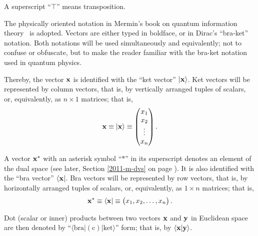 A superscript ``$\intercal$'' means transposition.

The physically oriented notation in Mermin's book on
quantum information theory~\cite{mermin-04} is adopted.
Vectors are either typed in boldface, or in Dirac's ``bra-ket'' notation\cite{dirac}.
Both notations will be used simultaneously and equivalently;
not to confuse or obfuscate, but to make  the reader familiar with the bra-ket
notation used in quantum physics.

Thereby,
the vector ${\bf x}$ is identified with the ``ket vector'' $\vert {\bf x}\rangle$.
Ket vectors will be represented by column vectors, that is, by vertically arranged tuples of scalars,
or, equivalently, as $n \times 1$ matrices; that is,
\begin{equation}
{\bf x}
\equiv
\vert {\bf x}\rangle
\equiv
\begin{pmatrix}
x_1\\
x_2\\
\vdots \\
x_n
\end{pmatrix}
.
\end{equation}


A vector ${\bf x}^\ast$ with an asterisk symbol ``$\ast$'' in its superscript denotes an element of the dual space (see later, Section \ref{2011-m-dvs} on page \pageref{2011-m-dvs}).
It is also identified with the ``bra vector'' $\langle {\bf x}\vert$.
Bra vectors will be represented by row vectors, that is, by horizontally arranged tuples of scalars,
or, equivalently, as $1 \times n$ matrices; that is,
\begin{equation}
{\bf x}^\ast
\equiv
\langle {\bf x}   \vert
\equiv
\begin{pmatrix}
x_1,
x_2,
\ldots ,
x_n
\end{pmatrix}
.
\end{equation}



Dot (scalar or inner) products between two vectors ${\bf x}$ and ${\bf y}$   in Euclidean space are then
denoted by ``$\langle \textrm{bra} \vert  (\textrm{c}) \vert \textrm{ket}  \rangle$''  form;
that is, by $\langle {\bf x} \vert  {\bf y}  \rangle$.




